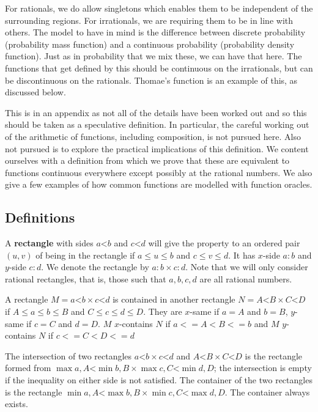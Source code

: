 \documentclass[12pt]{article}
\theoremstyle{remark}
\newcommand{\lt}{\mathord{<}}
\begin{document}
For rationals, we do allow singletons which enables them to be independent of the surrounding regions. For irrationals, we are requiring them to be in line with others. The model to have in mind is the difference between discrete probability (probability mass function) and a continuous probability (probability density function). Just as in probability that we mix these, we can have that here. The functions that get defined by this should be continuous on the irrationals, but can be discontinuous on the rationals. Thomae's function is an example of this, as discussed below. 

This is in an appendix as not all of the details have been worked out and so this should be taken as a speculative definition. In particular, the careful working out of the arithmetic of functions, including composition, is not pursued here. Also not pursued is to explore the practical implications of this definition. We content ourselves with a definition from which we prove that these are equivalent to functions continuous everywhere except possibly at the rational numbers. We also give a few examples of how common functions are modelled with function oracles. 

\subsection{Definitions}

A \textbf{rectangle} with sides $a \lt b$ and $c \lt d$ will give the property to an ordered pair $(u, v)$ of being in the rectangle if $a \leq u \leq b$ and $c \leq v \leq d$. It has $x$-side $a:b$ and $y$-side $c:d$. We denote the rectangle by $a:b \times c:d$. Note that we will only consider rational rectangles, that is, those such that $a, b, c, d$ are all rational numbers. 

A rectangle $M = a \lt b \times c \lt d$ is contained in another rectangle $N = A \lt B \times C \lt D$ if $A \leq a \leq b \leq B$ and $C \leq c \leq d \leq D$. They are $x$-same if $a=A$ and $b=B$, $y$-same if $c=C$ and $d=D$. $M$ $x$-contains $N$ if $a <= A < B <= b$ and $M$ $y$-contains $N$ if $c <= C < D <= d$

The intersection of two rectangles $a \lt b \times c \lt d$ and $A \lt B \times C \lt D$ is the rectangle formed from $\max{a,A} \lt \min{b,B} \times \max{c, C} \lt \min{d, D}$; the intersection is empty if the inequality on either side is not satisfied. The container of the two rectangles is the rectangle $\min{a,A} \lt \max{b,B} \times \min{c, C} \lt \max{d, D}$. The container always exists.
\end{document}
